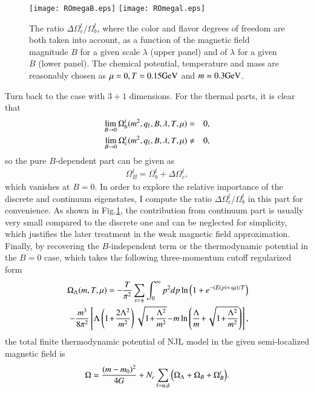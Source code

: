 \documentclass[aps,prd,amsmath,two column,amssymb,showpacs]{revtex4}
\begin{document}
\begin{figure}[!htb]
	\begin{center}
		\texttt{[image: ROmegaB.eps]}
		\texttt{[image: ROmegal.eps]}
		\caption{The ratio $\Delta\Omega_c^t/\Omega_b^t$, where the color and flavor degrees of freedom are both taken into account, as a function of the magnetic field magnitude $B$ for a given scale $\lambda$ (upper panel) and of $\lambda$ for a given $B$ (lower panel). The chemical potential, temperature and mass are reasonably chosen as $\mu=0, T=0.15 {\rm GeV}$ and $m=0.3 {\rm GeV}$.\label{ROmega}}
	\end{center}
\end{figure}
Turn back to the case with $3+1$ dimensions. For the thermal parts, it is clear that 
\begin{eqnarray}
\lim_{B\rightarrow0}\Omega_{b}^t(m^2,q_{\rm f},B,\lambda,T,\mu)&=&0,\nonumber\\
\lim_{B\rightarrow0}\Omega_{c}^t(m^2,q_{\rm f},B,\lambda,T,\mu)&\neq&0,
\end{eqnarray}
so the pure $B$-dependent part can be given as
\begin{eqnarray}
\Omega_B^t=\Omega_{b}^t+\Delta\Omega_{c}^t,
\end{eqnarray} 
which vanishes at $B=0$. In order to explore the relative importance of the discrete and continuum eigenstates, I compute the ratio $\Delta\Omega_{c}^t/\Omega_{b}^t$ in this part for convenience. As shown in Fig.\ref{ROmega}, the contribution from continuum part is usually very small compared to the discrete one and can be neglected for simplicity, which justifies the later treatment in the weak magnetic field approximation.
Finally, by recovering the $B$-independent term or the thermodynamic potential in the $B=0$ case, which takes the following three-momentum cutoff regularized form~\cite{Cao:2015dya}
\begin{eqnarray}\label{omegaL}
&&\!\!\!\!\!\!\!\!\!\!\!\!\Omega_\Lambda(m,T,\mu)=-{T\over\pi^2}\sum_{s=\pm}\int_0^\infty p^2 dp \ln\Big(1+e^{-(E(p)+s\mu)/T}\Big)\nonumber\\
&&\!\!\!-{m^3\over8\pi^2}\left[\Lambda\left(1\!+\!{2\Lambda^2\over m^2}\right)\sqrt{1\!+\!{\Lambda^2\over m^2}}\!-\!m\ln\left({\Lambda\over m}
\!+\!\sqrt{1\!+\!{\Lambda^2\over m^2}}\right)\right],
\end{eqnarray}
the total finite thermodynamic potential of NJL model in the given semi-localized magnetic field is
\begin{eqnarray}\label{omega3}
\Omega={(m-m_0)^2\over4G}+N_c\sum_{\rm f=u,d}\Big(\Omega_\Lambda+\Omega_B+\Omega_{B}^t\Big).
\end{eqnarray}
\end{document}
